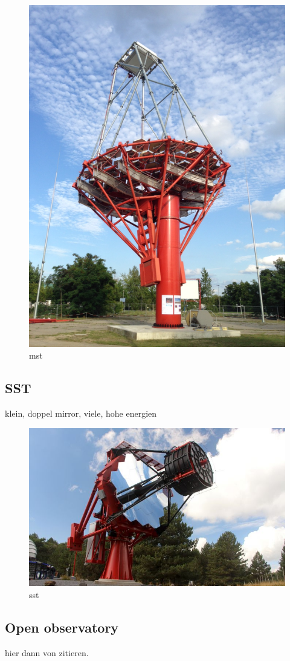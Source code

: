 \begin{figure}
	\center
	\includegraphics[width=.8\textwidth]{images/mst.png}
	\caption{mst \cite{cta_web}}
	\label{fig:mst}
\end{figure}

\subsection{SST}
klein, doppel mirror, viele, hohe energien

\begin{figure}
	\center
	\includegraphics[width=.8\textwidth]{images/sst.jpg}
	\caption{sst \cite{cta_web}}
	\label{fig:sst}
\end{figure}



\subsection{Open observatory}
hier dann von \cite{actis2011design} zitieren.


